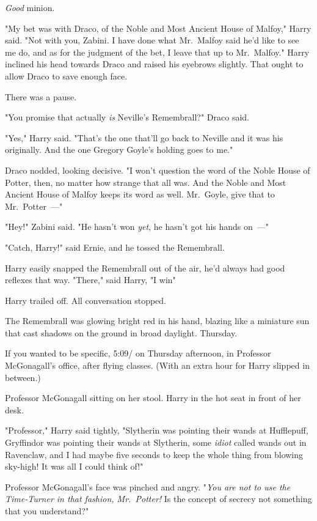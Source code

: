 \emph{Good} minion.

"My bet was with Draco, of the Noble and Most Ancient House of Malfoy," Harry
said. "Not with you, Zabini. I have done what Mr.~Malfoy said he'd like to see
me do, and as for the judgment of the bet, I leave that up to Mr.~Malfoy."
Harry inclined his head towards Draco and raised his eyebrows slightly. That
ought to allow Draco to save enough face.

There was a pause.

"You promise that actually \emph{is} Neville's Remembrall?" Draco said.

"Yes," Harry said. "That's the one that'll go back to Neville and it was his
originally. And the one Gregory Goyle's holding goes to me."

Draco nodded, looking decisive. "I won't question the word of the Noble House
of Potter, then, no matter how strange that all was. And the Noble and Most
Ancient House of Malfoy keeps its word as well. Mr.~Goyle, give that to
Mr.~Potter~---"

"Hey!" Zabini said. "He hasn't won \emph{yet}, he hasn't got his hands on~---"

"Catch, Harry!" said Ernie, and he tossed the Remembrall.

Harry easily snapped the Remembrall out of the air, he'd always had good
reflexes that way. "There," said Harry, "I win{\el}"

Harry trailed off. All conversation stopped.

The Remembrall was glowing bright red in his hand, blazing like a miniature sun
that cast shadows on the ground in broad daylight.
\sbreak
Thursday.

If you wanted to be specific, 5:09\PM/ on Thursday afternoon, in Professor
McGonagall's office, after flying classes. (With an extra hour for Harry
slipped in between.)

Professor McGonagall sitting on her stool. Harry in the hot seat in front of
her desk.

"Professor," Harry said tightly, "Slytherin was pointing their wands at
Hufflepuff, Gryffindor was pointing their wands at Slytherin, some \emph{idiot}
called wands out in Ravenclaw, and I had maybe five seconds to keep the whole
thing from blowing sky-high! It was all I could think of!"

Professor McGonagall's face was pinched and angry. "\emph{You are not to use
the Time-Turner in that fashion, Mr.~Potter!} Is the concept of secrecy not
something that you understand?"

